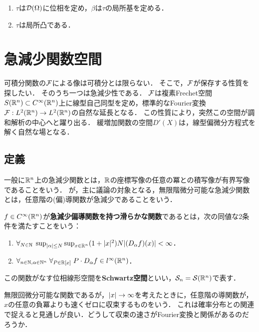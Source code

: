 \documentclass[uplatex,dvipdfmx]{jsreport}
\begin{document}
\begin{theorem}\mbox{}\label{thm-topology-on-the-space-of-test-functions}
    \begin{enumerate}
        \item $\tau$は$\mathcal{D}(\Omega)$に位相を定め，$\beta$は$\tau$の局所基を定める．
        \item $\tau$は局所凸である．
    \end{enumerate}
\end{theorem}

\section{急減少関数空間}

\begin{tcolorbox}[colframe=ForestGreen, colback=ForestGreen!10!white,breakable,colbacktitle=ForestGreen!40!white,coltitle=black,fonttitle=\bfseries\sffamily,
title=]
    可積分関数の$\mathcal{F}$による像は可積分とは限らない．
    そこで，$\mathcal{F}$が保存する性質を探したい．
    そのうち一つは急減少性である．
    $\mathcal{F}$は複素Frechet空間$S(\mathbb{R}^n)\subset C^\infty(\mathbb{R}^n)$上に線型自己同型を定め，標準的なFourier変換$\mathcal{F}:L^2(\mathbb{R}^n)\to L^2(\mathbb{R}^n)$の自然な延長となる．
    この性質により，突然この空間が調和解析の中心へと躍り出る．
    緩増加関数の空間$D'(X)$は，線型偏微分方程式を解く自然な場となる．
\end{tcolorbox}

\subsection{定義}

\begin{tcolorbox}[colframe=ForestGreen, colback=ForestGreen!10!white,breakable,colbacktitle=ForestGreen!40!white,coltitle=black,fonttitle=\bfseries\sffamily,
title=]
    一般に$\mathbb{R}^n$上の急減少関数とは，$\mathbb{R}$の座標写像の任意の冪との積写像が有界写像であることをいう．
    が，主に議論の対象となる，無限階微分可能な急減少関数とは，任意階の(偏)導関数が急減少であることをいう．
\end{tcolorbox}

\begin{definition}
    $f\in C^\infty(\mathbb{R}^n)$が\textbf{急減少偏導関数を持つ滑らかな関数}であるとは，次の同値な2条件を満たすことをいう：
    \begin{enumerate}
        \item $\forall_{N\in\mathbb{N}}\;\sup_{\lvert\alpha\rvert\le N}\sup_{x\in\mathbb{R}^n}(1+\lvert x\rvert^2)N\lvert(D_\alpha f)(x)\rvert<\infty$．
        \item $\forall_{n\in\mathbb{N},\alpha\in\mathbb{N}^n}\;\forall_{P\in\mathbb{R}[x]}\;P\cdot D_\alpha f\in l^\infty(\mathbb{R}^n)$．
    \end{enumerate}
    この関数がなす位相線形空間を\textbf{Schwartz空間}といい，$\mathcal{S}_n=\mathcal{S}(\mathbb{R}^n)$で表す．
\end{definition}
\begin{remarks}
    無限回微分可能な関数であるが，$\lvert x\rvert\to\infty$を考えたときに，任意階の導関数が，$x$の任意の負冪よりも速くゼロに収束するものをいう．
    これは確率分布との関連で捉えると見通しが良い．どうして収束の速さがFourier変換と関係があるのだろうか．
\end{remarks}
\end{document}
